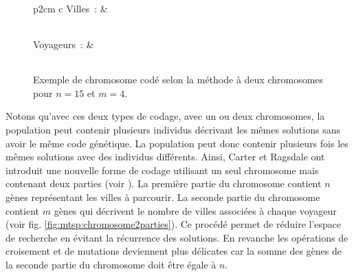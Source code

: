   \begin{figure}
  \centering
  \begin{tabular}{p{2cm} c}
    Villes~: & \begin{tabular}{|*{15}{p{0.4cm}|}}
    \hline
     \centering 1 & \centering 2 & \centering 5 & \centering 12 & \centering 4 & \centering 14 & \centering 15& \centering 6 & \centering 11 & \centering  9& \centering  7 & \centering 8 & \centering 10 & \centering 3 & \centering 13 \tabularnewline
     \hline
    \end{tabular} \tabularnewline
    
    Voyageurs~: & \begin{tabular}{|*{15}{p{0.4cm}|}}
    \hline
     \centering 2 & \centering 1 & \centering 1 & \centering 4 & \centering 3 & \centering 1 & \centering 4 & \centering 1 & \centering  2 & \centering 4 & \centering 4 & \centering 2 & \centering 3 & \centering 3 & \centering 2 \tabularnewline
     \hline
    \end{tabular}
    \tabularnewline
    \end{tabular}
    
    \caption{Exemple de chromosome codé selon la méthode à deux chromosomes pour $n=15$ et $m=4$.}
    \label{fig:mtsp:bichromosomes}
  \end{figure}

  
  Notons qu'avec ces deux types de codage, avec un ou deux chromosomes, la population peut contenir plusieurs individus décrivant les mêmes solutions sans avoir le même code génétique. La population peut donc contenir plusieurs fois les mêmes solutions avec des individus différents. Ainsi, Carter et Ragsdale ont introduit une nouvelle forme de codage utilisant un seul chromosome mais contenant deux parties (voir \cite{Carter2006}). La première partie du chromosome contient $n$ gènes représentant les villes à parcourir. La seconde partie du chromosome contient $m$ gènes qui décrivent le nombre de villes associées à chaque voyageur (voir fig. \ref{fig:mtsp:chromosome2parties}). Ce procédé permet de réduire l'espace de recherche en évitant la récurrence des solutions. En revanche les opérations de croisement et de mutations deviennent plus délicates car la somme des gènes de la seconde partie du chromosome doit être égale à $n$.
  
